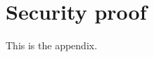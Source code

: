 \chapter{Security proof}\label{appendix:security-proof}
\thispagestyle{myheadings}

	This is the appendix.
